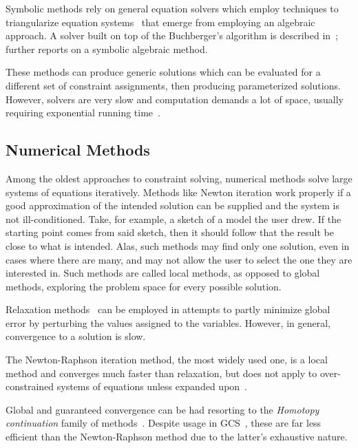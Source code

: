 Symbolic methods rely on general equation solvers which employ techniques to
triangularize equation systems~\cite{Chou:1988:IWMMTPG,Buchberger:1995:Grobner}
that emerge from employing an algebraic approach.  A solver built on top of the
Buchberger's algorithm is described in~\cite{Buchanan:1993:CDS};
 further reports on a symbolic algebraic method.

These methods can produce generic solutions which can be evaluated for a
different set of constraint assignments, then producing parameterized solutions.
However, solvers are very slow and computation demands a lot of space, usually
requiring exponential running time~\cite{Durand:1998:SNTCS}.

\subsection{Numerical Methods}%
\label{sec:intro.constraints.numerical}

Among the oldest approaches to constraint solving, numerical methods solve large
systems of equations iteratively.  Methods like Newton iteration work properly
if a good approximation of the intended solution can be supplied and the system
is not ill-conditioned.  Take, for example, a sketch of a model the user drew.
If the starting point comes from said sketch, then it should follow that the
result be close to what is intended.  Alas, such methods may find only one
solution, even in cases where there are many, and may not allow the user to
select the one they are interested in.  Such methods are called local methods,
as opposed to global methods, exploring the problem space for every possible
solution.

Relaxation
methods~\cite{Sutherland:1964:Sketchpad,Hillyard:1978:CNSTDT,Borning:1989:PLATL}
can be employed in attempts to partly minimize global error by perturbing the
values assigned to the variables.  However, in general, convergence to a
solution is slow.

The Newton-Raphson iteration method, the most widely used one, is a local method
and converges much faster than relaxation, but does not apply to
over-constrained systems of equations unless expanded
upon~\cite{Dedieu:2000:Newton}.

Global and guaranteed convergence can be had resorting to the \textit{Homotopy
continuation} family of methods~\cite{Allgower:1993:CPF}.  Despite usage in
\ac{GCS}~\cite{Lamure:1996:SGCH,Durand:1998:SNTCS}, these are far less efficient
than the Newton-Raphson method due to the latter's exhaustive nature.

